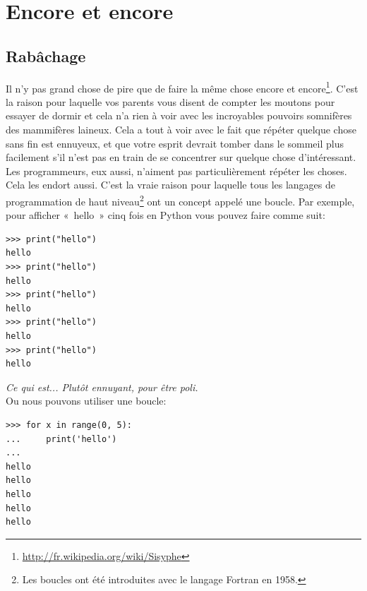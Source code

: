 



\chapter{Encore et encore}\label{ch:againandagain}
\section{Rabâchage}
Il n'y pas grand chose de pire que de faire la même chose encore et encore\footnote{\url{http://fr.wikipedia.org/wiki/Sisyphe}}.
C'est la raison pour laquelle vos parents vous disent de compter les moutons pour essayer de dormir et cela n'a rien à voir avec les incroyables pouvoirs somnifères des mammifères laineux. Cela  a tout à voir avec le fait que répéter quelque chose sans fin est ennuyeux, et que votre esprit devrait tomber dans le sommeil plus facilement s'il n'est pas en train de se concentrer sur quelque chose d'intéressant.\\


Les programmeurs, eux aussi, n'aiment pas particulièrement répéter les choses. Cela les endort aussi. C'est la vraie raison pour laquelle tous les langages de programmation de haut niveau\footnote{Les boucles ont été introduites avec le langage Fortran en 1958.} ont un concept appelé une boucle. Par exemple, pour afficher «~hello~»  cinq fois en Python vous pouvez faire comme suit:

\begin{Verbatim}[frame=single,rulecolor=\color{gray}, label=ne pas saisir]
>>> print("hello")
hello
>>> print("hello")
hello
>>> print("hello")
hello
>>> print("hello")
hello
>>> print("hello")
hello
\end{Verbatim}

\emph{Ce qui est... Plutôt ennuyant, pour être poli.}\\


Ou nous pouvons utiliser une boucle:

\begin{Verbatim}[frame=single,rulecolor=\color{green}, label=à taper avec attention]
>>> for x in range(0, 5):
...     print('hello')
...
hello
hello
hello
hello
hello
\end{Verbatim}

